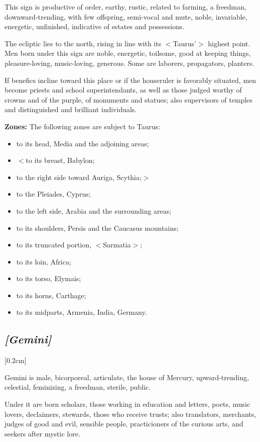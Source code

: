 This sign is productive of order, earthy, rustic, related to farming, a freedman, downward-trending, with few offspring, semi-vocal and mute, noble, invariable, energetic, unfinished, indicative of estates and possessions. 

The ecliptic lies to the north, rising in line with its $<$Taurus’$>$ highest point. Men born under this sign are noble, energetic, toilsome, good at keeping things, pleasure-loving, music-loving, generous. Some are laborers, propagators, planters. 

If benefics incline toward this place or if the houseruler is favorably situated, men become priests and school superintendants, as well as those judged worthy of crowns and of the purple, of monuments and statues; also supervisors of temples and distinguished and brilliant individuals.

\textbf{Zones:} The following zones are subject to Taurus: 
\begin{itemize}
\item to its head, Media and the adjoining areas; 
\item $<$to its breast, Babylon; 
\item to the right side toward Auriga, Scythia;$>$ 
\item to the Pleiades, Cyprus; 
\item to the left side, Arabia and the surrounding areas; 
\item to its shoulders, Persis and the Caucasus mountains; 
\item to its truncated portion, $<$Sarmatia$>$; 
\item to its loin, Africa; 
\item to its torso, Elymais; 
\item to its horns, Carthage; 
\item to its midparts, Armenia, India, Germany.
\end{itemize}

\secbr
\subsection{\textit{[Gemini]}}
[0.2cm]

Gemini is male, bicorporeal, articulate, the house of Mercury, upward-trending, celestial, feminizing, a freedman, sterile, public. 

Under it are born scholars, those working in education and letters, poets, music lovers, declaimers, stewards, those who receive trusts; also translators, merchants, judges of good and evil, sensible people, practicioners of the curious arts, and seekers after mystic lore. 

